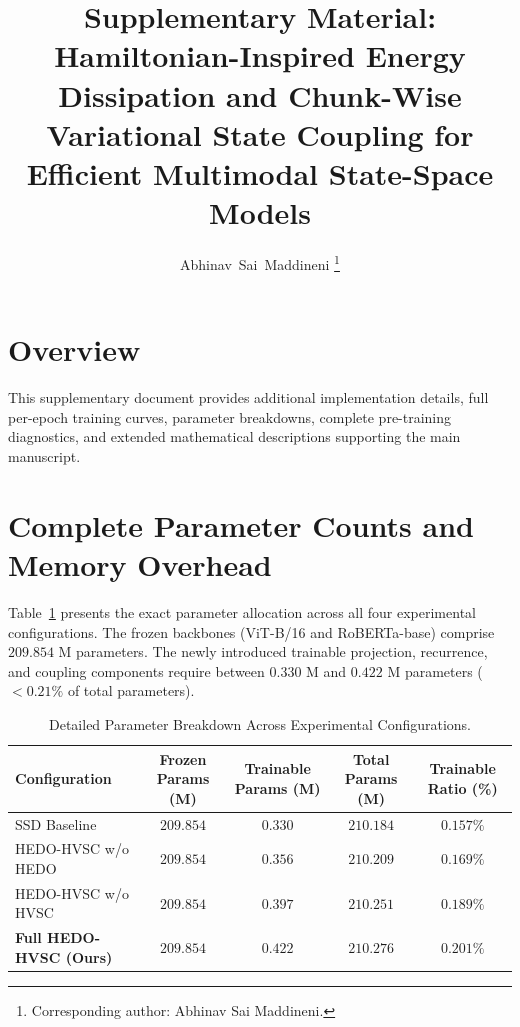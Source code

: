 \documentclass[11pt,journal,onecolumn,draftcls]{IEEEtran}
\begin{document}
\title{Supplementary Material:\\Hamiltonian-Inspired Energy Dissipation and Chunk-Wise Variational State Coupling for Efficient Multimodal State-Space Models}

\author{Abhinav~Sai~Maddineni%
\thanks{Corresponding author: Abhinav Sai Maddineni.}%
}

\maketitle

\section{Overview}
This supplementary document provides additional implementation details, full per-epoch training curves, parameter breakdowns, complete pre-training diagnostics, and extended mathematical descriptions supporting the main manuscript.

\section{Complete Parameter Counts and Memory Overhead}
Table~\ref{tab:supp_params} presents the exact parameter allocation across all four experimental configurations. The frozen backbones (ViT-B/16 and RoBERTa-base) comprise $209.854\text{ M}$ parameters. The newly introduced trainable projection, recurrence, and coupling components require between $0.330\text{ M}$ and $0.422\text{ M}$ parameters ($<0.21\%$ of total parameters).

\begin{table}[h]
\centering
\caption{Detailed Parameter Breakdown Across Experimental Configurations.}
\label{tab:supp_params}
\begin{tabular}{lcccc}
\toprule
\textbf{Configuration} & \textbf{Frozen Params (M)} & \textbf{Trainable Params (M)} & \textbf{Total Params (M)} & \textbf{Trainable Ratio (\%)} \\
\midrule
SSD Baseline & $209.854$ & $0.330$ & $210.184$ & $0.157\%$ \\
HEDO-HVSC w/o HEDO & $209.854$ & $0.356$ & $210.209$ & $0.169\%$ \\
HEDO-HVSC w/o HVSC & $209.854$ & $0.397$ & $210.251$ & $0.189\%$ \\
\textbf{Full HEDO-HVSC (Ours)} & $209.854$ & $\mathbf{0.422}$ & $\mathbf{210.276}$ & $\mathbf{0.201\%}$ \\
\bottomrule
\end{tabular}
\end{table}
\end{document}
